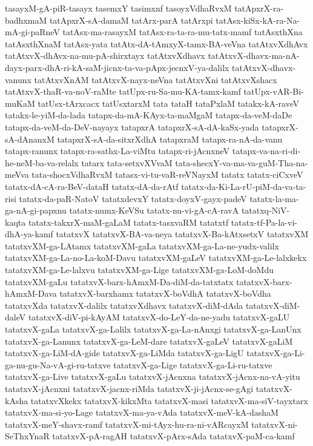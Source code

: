 {tasayxM-gA-piR-tasayx
tasemxY
tasimxnf
tasoyxVdhaRvxM
tatApxrX-ra-badhxmaM
tatApxrX-sA-damaM
tatArx-parA
tatArxpi
tatAsx-kiSx-kA-ra-Na-mA-gi-paRneV
tatAsx-ma-rasayxM
tatAsx-ra-ta-ra-mu-tatx-mamf
tatAsxthXna
tatAsxthXnaM
tatAsx-yata
tatAtx-dA-tAmxyX-tamx-BA-veVna
tatAtxvXdhAvx
tatAtxvX-dhAvx-na-mu-pA-shirxtayx
tatAtxvXdhavx
tatAtxvX-dhavx-ma-nA-dayx-parx-dhA-ri-kA-saM-jicnx-ta-va-pApx-jecnxV-ya-dalilx
tatAtxvX-dhavx-vanunx
tatAtxvXnAM
tatAtxvX-nayx-neVna
tatAtxvXni
tatAtxvXshacx
tatAtxvX-thaR-va-noV-raMte
tatUpx-ru-Sa-mu-KA-tamx-kamf
tatUpx-vAR-Bi-muKaM
tatUsx-tArxcacx
tatUsxtarxM
tata
tataH
tataPxlaM
tatakx-kA-raveV
tatakx-le-yiM-da-lada
tatapx-da-mA-KAyx-ta-maMgaM
tatapx-da-veM-daDe
tatapx-da-veM-da-DeV-nayayx
tatapxrA
tatapxrX-sA-dA-kaSx-yada
tatapxrX-sA-dAnanxM
tatapxrX-sA-da-sitxrXdhA
tatapxraM
tatapx-ra-nA-da-vanu
tatapx-ranunx
tatapx-ra-sathx-La-viMtu
tatapx-ri-jAcnxneV
tatapx-va-na-ri-di-he-neM-ba-va-relalx
tatarx
tata-setxvXVvaM
tata-shecxY-va-ma-va-guM-Tha-na-meVva
tata-shocxVdhaRvxM
tatasx-vi-tu-vaR-reVNayxM
tatatx
tatatx-ciCxveV
tatatx-dA-cA-ra-BeV-dataH
tatatx-dA-da-rAtf
tatatx-da-Ki-La-rU-piM-da-va-ta-risi
tatatx-da-paR-NatoV
tatatxdevxY
tatatx-doyxV-gayx-padeV
tatatx-la-ma-ga-nA-gi-papxnu
tatatx-numx-KeVSu
tatatx-nu-vi-gA-cA-ravA
tatatxq-NiV-kaqta
tatatx-takxrX-maM-gaLaM
tatatx-tasxvaRM
tatatxtf
tatatx-tf-Pa-la-vi-dhA-ya-kamf
tatatxvX
tatatxvX-BA-va-neya
tatatxvX-Ba-kAtxsetxV
tatatxvXM
tatatxvXM-ga-LAtamx
tatatxvXM-gaLa
tatatxvXM-ga-La-ne-yudx-valilx
tatatxvXM-ga-La-no-La-koM-Davu
tatatxvXM-gaLeV
tatatxvXM-ga-Le-lalxkekx
tatatxvXM-ga-Le-lalxvu
tatatxvXM-ga-Lige
tatatxvXM-ga-LoM-doMdu
tatatxvXM-gaLu
tatatxvX-barx-hAmxM-Da-diM-da-tatxtatx
tatatxvX-barx-hAmxM-Dava
tatatxvX-barxhamx
tatatxvX-boVdhA
tatatxvX-boVdha
tatatxvXda
tatatxvX-dalilx
tatatxvXdhavx
tatatxvX-diM-dAda
tatatxvX-diM-daleV
tatatxvX-diV-pi-kAyAM
tatatxvX-do-LeY-da-ne-yadu
tatatxvX-gaLU
tatatxvX-gaLa
tatatxvX-ga-Lalilx
tatatxvX-ga-La-nAnxgi
tatatxvX-ga-LanUnx
tatatxvX-ga-Lanunx
tatatxvX-ga-LeM-dare
tatatxvX-gaLeV
tatatxvX-gaLiM
tatatxvX-ga-LiM-dA-gide
tatatxvX-ga-LiMda
tatatxvX-ga-LigU
tatatxvX-ga-Li-ga-nu-gu-Na-vA-gi-ru-tatxve
tatatxvX-ga-Lige
tatatxvX-ga-Li-ru-tatxve
tatatxvX-ga-Live
tatatxvX-gaLu
tatatxvX-jAcnxna
tatatxvX-jAcnx-na-vA-yitu
tatatxvX-jAcnxni
tatatxvX-jacnx-riMda
tatatxvX-ji-jAcnx-se-gAgi
tatatxvX-kAsha
tatatxvXkekx
tatatxvX-kikxMta
tatatxvX-masi
tatatxvX-ma-siV-tayxtarx
tatatxvX-ma-si-yo-Lage
tatatxvX-ma-ya-vAda
tatatxvX-meV-kA-dashaM
tatatxvX-meY-shavx-ramf
tatatxvX-mi-tAyx-hu-ra-ni-vARcayxM
tatatxvX-ni-SeThxYnaR
tatatxvX-pA-ragAH
tatatxvX-pArx-sAda
tatatxvX-paM-ca-kamf
}
